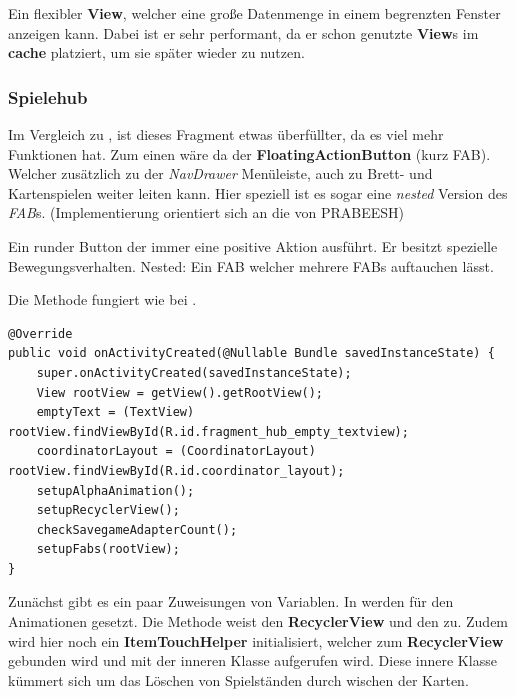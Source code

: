 \begin{infobox}[frametitle=RecyclerView]
Ein flexibler \textbf{View}, welcher eine große Datenmenge in einem begrenzten
Fenster anzeigen kann. Dabei ist er sehr performant, da er schon genutzte
\textbf{View}s im \textbf{cache} platziert, um sie später wieder zu nutzen. 
\end{infobox}

\subsubsection{Spielehub}

Im Vergleich zu , ist dieses Fragment etwas überfüllter, da
es viel mehr Funktionen hat. Zum einen wäre da der \textbf{FloatingActionButton}
(kurz FAB). Welcher zusätzlich zu der \emph{NavDrawer} Menüleiste, auch zu
Brett- und Kartenspielen weiter leiten kann. Hier speziell ist es sogar eine
\emph{nested} Version des \emph{FAB}s. (Implementierung orientiert sich an
die von PRABEESH\cite{PRABEESHR2016})

\begin{infobox}[frametitle=FloatingActionButton]
Ein runder Button der immer eine positive Aktion ausführt. Er
besitzt spezielle Bewegungsverhalten. Nested: Ein FAB welcher mehrere FABs
auftauchen lässt.
\end{infobox}

Die Methode  fungiert wie bei .

\begin{lstlisting}[caption={Spielehub onActivityCreated() Methode},captionpos=b]
@Override
public void onActivityCreated(@Nullable Bundle savedInstanceState) {
	super.onActivityCreated(savedInstanceState);
	View rootView = getView().getRootView();
	emptyText = (TextView) rootView.findViewById(R.id.fragment_hub_empty_textview);
	coordinatorLayout = (CoordinatorLayout) rootView.findViewById(R.id.coordinator_layout);
	setupAlphaAnimation();
	setupRecyclerView();
	checkSavegameAdapterCount();
	setupFabs(rootView);
}
\end{lstlisting}

Zunächst gibt es ein paar Zuweisungen von Variablen. In
 werden für den  Animationen
gesetzt. Die Methode  weist den \textbf{RecyclerView}
und den  zu. Zudem wird hier noch ein
\textbf{ItemTouchHelper} initialisiert, welcher zum \textbf{RecyclerView}
gebunden wird und mit der inneren Klasse  aufgerufen
wird. Diese innere Klasse kümmert sich um das Löschen von Spielständen durch
wischen der Karten.

